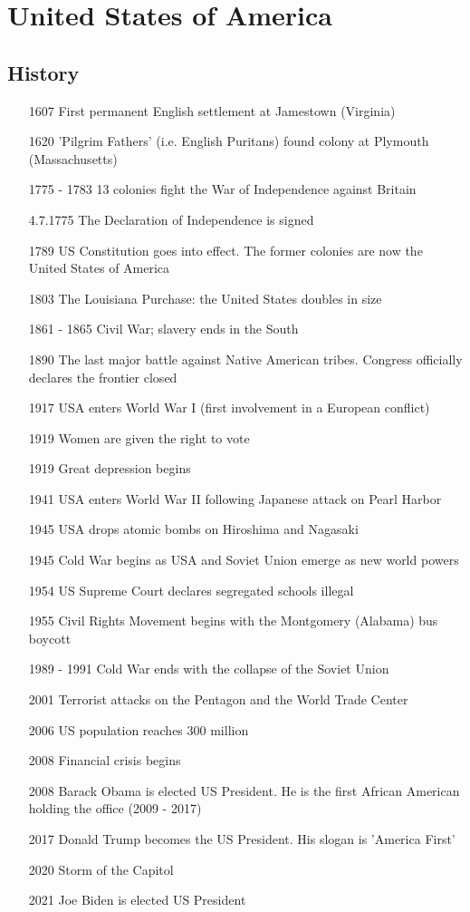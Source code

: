 \documentclass[10pt]{article}
\begin{document}
\section{United States of America}
	\label{sec:usa}
\subsection{History}
	\label{ssec:usa@history}
\begin{itemize}[leftmargin=5pt+]
\item[1607] First permanent English settlement at Jamestown (Virginia)
\item[1620] 'Pilgrim Fathers' (i.e. English Puritans) found colony at Plymouth (Massachusetts)
\item[1775 - 1783] 13 colonies fight the War of Independence against Britain
\item[4.7.1775] The Declaration of Independence is signed
\item[1789] US Constitution goes into effect. The former colonies are now the United States of America
\item[1803] The Louisiana Purchase: the United States doubles in size
\item[1861 - 1865] Civil War; slavery ends in the South
\item[1890] The last major battle against Native American tribes. Congress officially declares the frontier closed
\item[1917] USA enters World War I (first involvement in a European conflict)
\item[1919] Women are given the right to vote
\item[1919] Great depression begins
\item[1941] USA enters World War II following Japanese attack on Pearl Harbor
\item[1945] USA drops atomic bombs on Hiroshima and Nagasaki
\item[1945] Cold War begins as USA and Soviet Union emerge as new world powers
\item[1954] US Supreme Court declares segregated schools illegal
\item[1955] Civil Rights Movement begins with the Montgomery (Alabama) bus boycott
\item[1989 - 1991] Cold War ends with the collapse of the Soviet Union
\item[2001] Terrorist attacks on the Pentagon and the World Trade Center
\item[2006] US population reaches 300 million
\item[2008] Financial crisis begins
\item[2008] Barack Obama is elected US President. He is the first African American holding the office (2009 - 2017)
\item[2017] Donald Trump becomes the US President. His slogan is 'America First'
\item[2020] Storm of the Capitol
\item[2021] Joe Biden is elected US President
\end{itemize}
\end{document}
